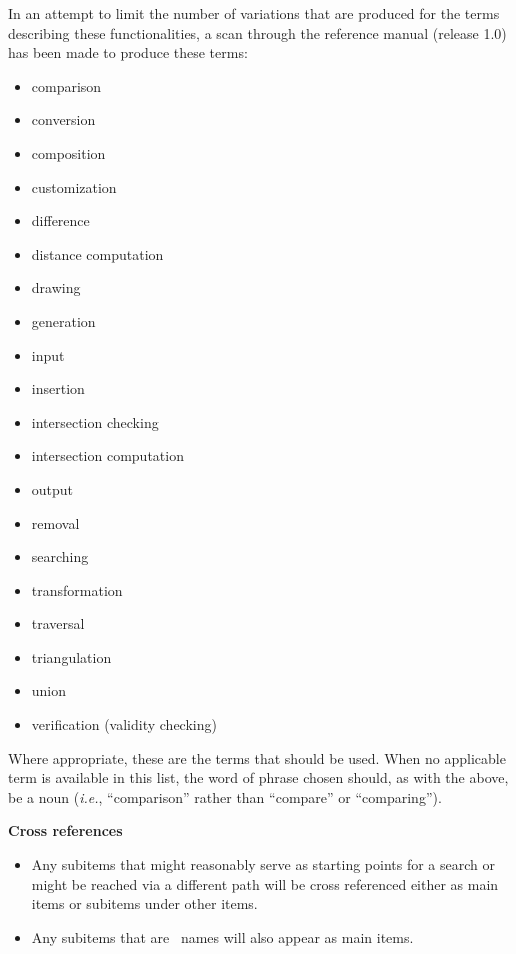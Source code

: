 \documentclass{article}
\begin{document}
\begin{description}
        In an attempt to limit the number of variations that are produced
        for the terms describing these functionalities, a scan through the
        reference manual (release 1.0) has been made to produce these
        terms:
        \begin{itemize}
           \item comparison
           \item conversion
           \item composition
           \item customization
           \item difference
           \item distance computation
           \item drawing
           \item generation
           \item input
           \item insertion
           \item intersection checking
           \item intersection computation
           \item output
           \item removal
           \item searching
           \item transformation
           \item traversal
           \item triangulation
           \item union
           \item verification (validity checking)
        \end{itemize}
        Where appropriate, these are the terms that should be used.  When
        no applicable term is available in this list, the word of phrase
        chosen should, as with the above, be a noun ({\it i.e.}, ``comparison''
        rather than ``compare'' or ``comparing'').


   \item{\bf Cross references}
        \begin{itemize}
           \item Any subitems that might reasonably serve as starting points 
                 for a search or might be reached via a different path will
                 be cross referenced either as main items or subitems under
                 other items.
           \item Any subitems that are \CC\ names will also appear as main
                 items.
        \end{itemize}


\end{description}
\end{document}
